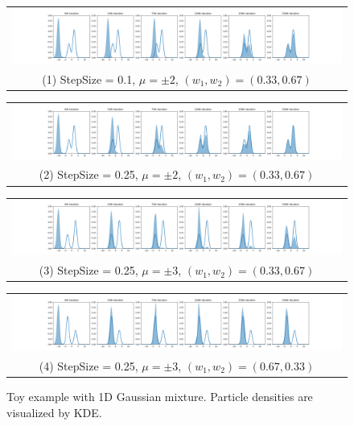 \begin{figure}[h]
    \centering
    \begin{tabular}{@{}c@{}}
        \includegraphics[width=\textwidth]{figs/toy-figure1_step0.1_mu2.0_w0.33_gaussian.png} \\
        \small (1) StepSize = 0.1, $\mu = \pm 2$, $(w_1, w_2) = (0.33, 0.67)$
    \end{tabular}
    
    \begin{tabular}{@{}c@{}}
        \includegraphics[width=\textwidth]{figs/toy-figure1.png} \\
        \small (2) StepSize = 0.25, $\mu = \pm 2$, $(w_1, w_2) = (0.33, 0.67)$
    \end{tabular}
    
    \begin{tabular}{@{}c@{}}
        \includegraphics[width=\textwidth]{figs/toy-figure1_step0.25_mu3.0_w0.33_gaussian.png} \\
        \small (3) StepSize = 0.25, $\mu = \pm 3$, $(w_1, w_2) = (0.33, 0.67)$
    \end{tabular}
    
    \begin{tabular}{@{}c@{}}
        \includegraphics[width=\textwidth]{figs/toy-figure1_step0.25_mu3.0_w0.67_gaussian.png} \\
        \small (4) StepSize = 0.25, $\mu = \pm 3$, $(w_1, w_2) = (0.67, 0.33)$
    \end{tabular}
    
     
    \caption{Toy example with 1D Gaussian mixture. Particle densities are visualized by KDE.}
    \label{fig:toy1dgaussian}
\end{figure}

